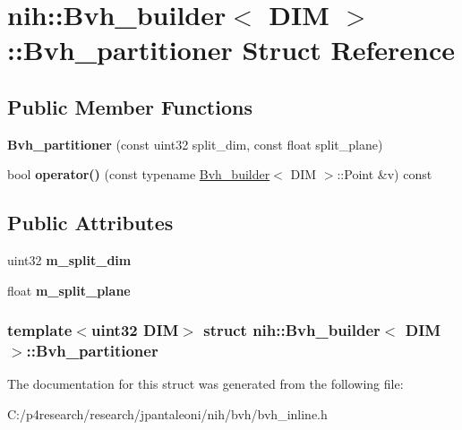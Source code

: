 \hypertarget{structnih_1_1_bvh__builder_1_1_bvh__partitioner}{
\section{nih\-:\-:\-Bvh\-\_\-builder$<$ \-D\-I\-M $>$\-:\-:\-Bvh\-\_\-partitioner \-Struct \-Reference}
\label{structnih_1_1_bvh__builder_1_1_bvh__partitioner}
}
\subsection*{\-Public \-Member \-Functions}
\begin{DoxyCompactItemize}
\item 
\hypertarget{structnih_1_1_bvh__builder_1_1_bvh__partitioner_a8befe8bd5e728ef4e66d879cf4a5aa44}{
{\bfseries \-Bvh\-\_\-partitioner} (const uint32 split\-\_\-dim, const float split\-\_\-plane)}
\label{structnih_1_1_bvh__builder_1_1_bvh__partitioner_a8befe8bd5e728ef4e66d879cf4a5aa44}

\item 
\hypertarget{structnih_1_1_bvh__builder_1_1_bvh__partitioner_a558a324a0cba121314c02d6ba12c7ad1}{
bool {\bfseries operator()} (const typename \hyperlink{classnih_1_1_bvh__builder}{\-Bvh\-\_\-builder}$<$ \-D\-I\-M $>$\-::\-Point \&v) const }
\label{structnih_1_1_bvh__builder_1_1_bvh__partitioner_a558a324a0cba121314c02d6ba12c7ad1}

\end{DoxyCompactItemize}
\subsection*{\-Public \-Attributes}
\begin{DoxyCompactItemize}
\item 
\hypertarget{structnih_1_1_bvh__builder_1_1_bvh__partitioner_adc4cebd879749042633c0b7be90fabfa}{
uint32 {\bfseries m\-\_\-split\-\_\-dim}}
\label{structnih_1_1_bvh__builder_1_1_bvh__partitioner_adc4cebd879749042633c0b7be90fabfa}

\item 
\hypertarget{structnih_1_1_bvh__builder_1_1_bvh__partitioner_ad8270c2fbcfbb1f5bea3341d98d11140}{
float {\bfseries m\-\_\-split\-\_\-plane}}
\label{structnih_1_1_bvh__builder_1_1_bvh__partitioner_ad8270c2fbcfbb1f5bea3341d98d11140}

\end{DoxyCompactItemize}
\subsubsection*{template$<$uint32 \-D\-I\-M$>$ struct nih\-::\-Bvh\-\_\-builder$<$ D\-I\-M $>$\-::\-Bvh\-\_\-partitioner}



\-The documentation for this struct was generated from the following file\-:\begin{DoxyCompactItemize}
\item 
\-C\-:/p4research/research/jpantaleoni/nih/bvh/bvh\-\_\-inline.\-h\end{DoxyCompactItemize}
